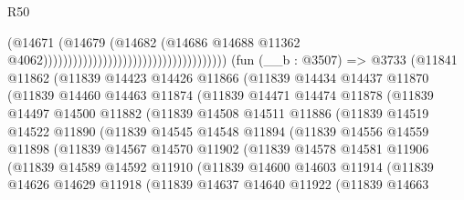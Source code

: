 \begin{lexlean}{R50}
\begin{coremodule}
                                                                      (@14671
                                                                        (@14679
                                                                          (@14682
                                                                            (@14686
                                                                              @14688
                                                                              @11362
                                                                              @4062)))))))))))))))))))))))))))))))))))))
    (fun (__b : @3507) =>
    @3733
      (@11841
        @11862
        (@11839
          @14423
          @14426
          @11866
          (@11839
            @14434
            @14437
            @11870
            (@11839
              @14460
              @14463
              @11874
              (@11839
                @14471
                @14474
                @11878
                (@11839
                  @14497
                  @14500
                  @11882
                  (@11839
                    @14508
                    @14511
                    @11886
                    (@11839
                      @14519
                      @14522
                      @11890
                      (@11839
                        @14545
                        @14548
                        @11894
                        (@11839
                          @14556
                          @14559
                          @11898
                          (@11839
                            @14567
                            @14570
                            @11902
                            (@11839
                              @14578
                              @14581
                              @11906
                              (@11839
                                @14589
                                @14592
                                @11910
                                (@11839
                                  @14600
                                  @14603
                                  @11914
                                  (@11839
                                    @14626
                                    @14629
                                    @11918
                                    (@11839
                                      @14637
                                      @14640
                                      @11922
                                      (@11839
                                        @14663

\end{coremodule}
\end{lexlean}
